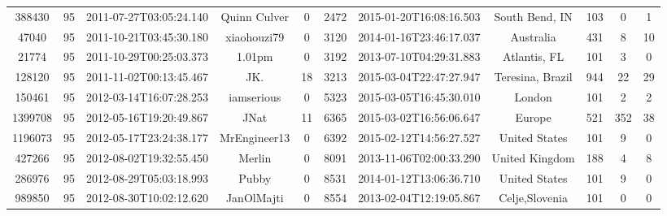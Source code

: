\documentclass[12pt,a4paper,twoside,openright,titlepage,final]{article}
\begin{document}
\begin{landscape}
\begin{center}
\begin{longtable}{@{\extracolsep{\fill}}*{11}{c}}
			388430             & 95           & 2011-07-27T03:05:24.140 & Quinn Culver         & 0                  & 2472        & 2015-01-20T16:08:16.503 & South Bend, IN          & 103                 & 0                & 1              \\
			47040              & 95           & 2011-10-21T03:45:30.180 & xiaohouzi79          & 0                  & 3120        & 2014-01-16T23:46:17.037 & Australia               & 431                 & 8                & 10             \\
			21774              & 95           & 2011-10-29T00:25:03.373 & 1.01pm               & 0                  & 3192        & 2013-07-10T04:29:31.883 & Atlantis, FL            & 101                 & 3                & 0              \\
			128120             & 95           & 2011-11-02T00:13:45.467 & JK.                  & 18                 & 3213        & 2015-03-04T22:47:27.947 & Teresina, Brazil        & 944                 & 22               & 29             \\
			150461             & 95           & 2012-03-14T16:07:28.253 & iamserious           & 0                  & 5323        & 2015-03-05T16:45:30.010 & London                  & 101                 & 2                & 2              \\
			1399708            & 95           & 2012-05-16T19:20:49.867 & JNat                 & 11                 & 6365        & 2015-03-02T16:56:06.647 & Europe                  & 521                 & 352              & 38             \\
			1196073            & 95           & 2012-05-17T23:24:38.177 & MrEngineer13         & 0                  & 6392        & 2015-02-12T14:56:27.527 & United States           & 101                 & 9                & 0              \\
			427266             & 95           & 2012-08-02T19:32:55.450 & Merlin               & 0                  & 8091        & 2013-11-06T02:00:33.290 & United Kingdom          & 188                 & 4                & 8              \\
			286976             & 95           & 2012-08-29T05:03:18.993 & Pubby                & 0                  & 8531        & 2014-01-12T13:06:36.710 & United States           & 101                 & 9                & 0              \\
			989850             & 95           & 2012-08-30T10:02:12.620 & JanOlMajti           & 0                  & 8554        & 2013-02-04T12:19:05.867 & Celje,Slovenia          & 101                 & 0                & 0              \\

\end{longtable}
\end{center}
\end{landscape}
\end{document}
